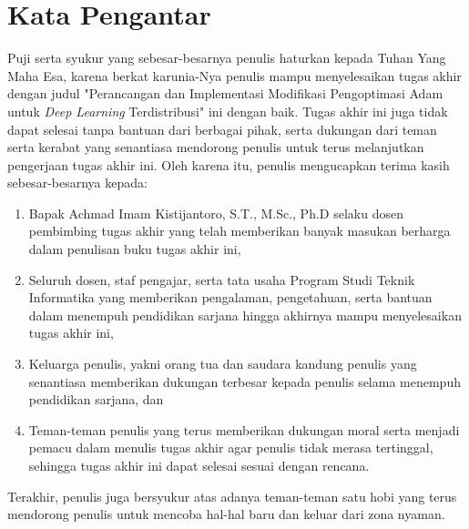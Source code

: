 \chapter*{Kata Pengantar}

Puji serta syukur yang sebesar-besarnya penulis haturkan kepada Tuhan Yang Maha Esa, karena berkat karunia-Nya penulis mampu menyelesaikan tugas akhir dengan judul "Perancangan dan Implementasi Modifikasi Pengoptimasi Adam untuk \emph{Deep Learning} Terdistribusi" ini dengan baik. Tugas akhir ini juga tidak dapat selesai tanpa bantuan dari berbagai pihak, serta dukungan dari teman serta kerabat yang senantiasa mendorong penulis untuk terus melanjutkan pengerjaan tugas akhir ini. Oleh karena itu, penulis mengucapkan terima kasih sebesar-besarnya kepada:

\begin{enumerate}
  \item Bapak Achmad Imam Kistijantoro, S.T., M.Sc., Ph.D selaku dosen pembimbing tugas akhir yang telah memberikan banyak masukan berharga dalam penulisan buku tugas akhir ini,
  \item Seluruh dosen, staf pengajar, serta tata usaha Program Studi Teknik Informatika yang memberikan pengalaman, pengetahuan, serta bantuan dalam menempuh pendidikan sarjana hingga akhirnya mampu menyelesaikan tugas akhir ini,
  \item Keluarga penulis, yakni orang tua dan saudara kandung penulis yang senantiasa memberikan dukungan terbesar kepada penulis selama menempuh pendidikan sarjana, dan
  \item Teman-teman penulis yang terus memberikan dukungan moral serta menjadi pemacu dalam menulis tugas akhir agar penulis tidak merasa tertinggal, sehingga tugas akhir ini dapat selesai sesuai dengan rencana.
\end{enumerate}

Terakhir, penulis juga bersyukur atas adanya teman-teman satu hobi yang terus mendorong penulis untuk mencoba hal-hal baru dan keluar dari zona nyaman.
